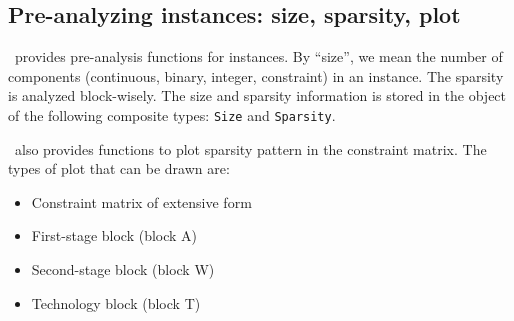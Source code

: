 %
%

\subsection{Pre-analyzing instances: size, sparsity, plot}
\siplibjl\ provides pre-analysis functions for instances. By ``size'', we mean the number of components (continuous, binary, integer, constraint) in an instance. The sparsity is analyzed block-wisely. The size and sparsity information is stored in the object of the following composite types: \texttt{Size} and \texttt{Sparsity}.

\siplibjl\ also provides functions to plot sparsity pattern in the constraint matrix. The types of plot that can be drawn are:
\begin{itemize}
	\item Constraint matrix of extensive form
	\item First-stage block (block A)
	\item Second-stage block (block W)
	\item Technology block (block T)
\end{itemize}


